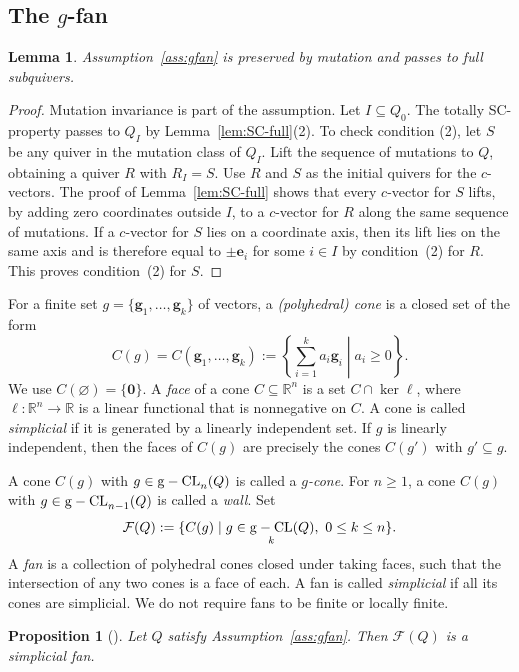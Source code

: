 \documentclass[11pt,reqno]{amsart}
\numberwithin{equation}{section}
\theoremstyle{definition}
\theoremstyle{plain}
\newtheorem{lemma}[example]{Lemma}
\newtheorem{proposition}[example]{Proposition}
\newcommand{\relmiddle}[1]{\mathrel{}\middle#1\mathrel{}}
\DeclareMathOperator{\gseed}{{\rm g-CL}}
\begin{document}
\subsection{The $g$-fan}
	\begin{lemma}\label{lem:assumption-restriction}
		Assumption~\ref{ass:gfan} is preserved by mutation and passes to full subquivers.
	\end{lemma}
	
	\begin{proof}
		Mutation invariance is part of the assumption. Let $I\subseteq Q_0$. The totally SC-property passes to $Q_I$ by Lemma~\ref{lem:SC-full}(2). To check condition (2), let $S$ be any quiver in the mutation class of $Q_I$. Lift the sequence of mutations to $Q$, obtaining a quiver $R$ with $R_I=S$. Use $R$ and $S$ as the initial quivers for the $c$-vectors. The proof of Lemma~\ref{lem:SC-full} shows that every $c$-vector for $S$ lifts, by adding zero coordinates outside $I$, to a $c$-vector for $R$ along the same sequence of mutations. If a $c$-vector for $S$ lies on a coordinate axis, then its lift lies on the same axis and is therefore equal to $\pm\mathbf e_i$ for some $i\in I$ by condition~(2) for $R$. This proves condition~(2) for $S$.
	\end{proof}
	
	For a finite set $g=\{\mathbf g_1,\ldots,\mathbf g_k\}$ of vectors, a \emph{(polyhedral) cone} is a closed set of the form
	\[
	C(g)=C(\mathbf g_1,\ldots,\mathbf g_k)
	:=\left\{\sum_{i=1}^k a_i\mathbf g_i\relmiddle|a_i\geq0\right\}.
	\]
	We use $C(\varnothing)=\{\mathbf0\}$. A \emph{face} of a cone $C\subseteq\mathbb R^n$ is a set $C\cap\ker\ell$, where $\ell:\mathbb R^n\to\mathbb R$ is a linear functional that is nonnegative on $C$. A cone is called \emph{simplicial} if it is generated by a linearly independent set. If $g$ is linearly independent, then the faces of $C(g)$ are precisely the cones $C(g')$ with $g'\subseteq g$.
  
  	A cone $C(g)$ with $g\in\gseed_n(Q)$ is called a \emph{$g$-cone}. For $n\geq1$, a cone $C(g)$ with $g\in\gseed_{n-1}(Q)$ is called a \emph{wall}. Set
	\[
	\mathcal F(Q):=\{C(g)\mid g\in\gseed_k(Q),\ 0\leq k\leq n\}.
	\]
	A \emph{fan} is a collection of polyhedral cones closed under taking faces, such that the intersection of any two cones is a face of each. A fan is called \emph{simplicial} if all its cones are simplicial. We do not require fans to be finite or locally finite.
	
	\begin{proposition}[{\cite[Proposition~6.6]{AC25}}]\label{prop:fan}
		Let $Q$ satisfy Assumption~\ref{ass:gfan}. Then $\mathcal F(Q)$ is a simplicial fan.
	\end{proposition}
	
\end{document}
